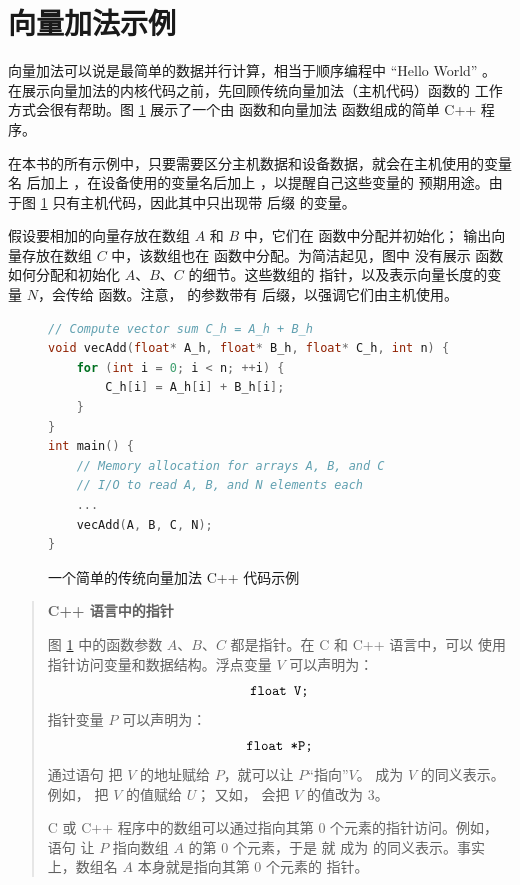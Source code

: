 \section{向量加法示例}
\label{sec:vector-addition-example}

向量加法可以说是最简单的数据并行计算，相当于顺序编程中 ``Hello World'' 。
在展示向量加法的内核代码之前，先回顾传统向量加法（主机代码）函数的
工作方式会很有帮助。图 \ref{fig:2-4} 展示了一个由  函数和向量加法
函数组成的简单 C++ 程序。

在本书的所有示例中，只要需要区分主机数据和设备数据，就会在主机使用的变量名
后加上 ，在设备使用的变量名后加上 ，以提醒自己这些变量的
预期用途。由于图 \ref{fig:2-4} 只有主机代码，因此其中只出现带  后缀
的变量。

假设要相加的向量存放在数组 $A$ 和 $B$ 中，它们在  函数中分配并初始化；
输出向量存放在数组 $C$ 中，该数组也在  函数中分配。为简洁起见，图中
没有展示  函数如何分配和初始化 $A$、$B$、$C$ 的细节。这些数组的
指针，以及表示向量长度的变量 $N$，会传给  函数。注意，
 的参数带有  后缀，以强调它们由主机使用。

\begin{figure}[htbp]
  \centering
  \begin{lstlisting}[language=C++]
// Compute vector sum C_h = A_h + B_h
void vecAdd(float* A_h, float* B_h, float* C_h, int n) {
    for (int i = 0; i < n; ++i) {
        C_h[i] = A_h[i] + B_h[i];
    }
}
int main() {
    // Memory allocation for arrays A, B, and C
    // I/O to read A, B, and N elements each
    ...
    vecAdd(A, B, C, N);
}
  \end{lstlisting}
  \caption{一个简单的传统向量加法 C++ 代码示例}
  \label{fig:2-4}
\end{figure}

\begin{quote}
\textbf{C++ 语言中的指针}

图 \ref{fig:2-4} 中的函数参数 $A$、$B$、$C$ 都是指针。在 C 和 C++ 语言中，可以
使用指针访问变量和数据结构。浮点变量 $V$ 可以声明为：
\[
\code{float V;}
\]
指针变量 $P$ 可以声明为：
\[
\code{float *P;}
\]
通过语句  把 $V$ 的地址赋给 $P$，就可以让 $P$“指向”$V$。
 成为 $V$ 的同义表示。例如， 把 $V$ 的值赋给 $U$；
又如， 会把 $V$ 的值改为 3。

C 或 C++ 程序中的数组可以通过指向其第 0 个元素的指针访问。例如，语句
 让 $P$ 指向数组 $A$ 的第 0 个元素，于是  就
成为  的同义表示。事实上，数组名 $A$ 本身就是指向其第 0 个元素的
指针。
\end{quote}

